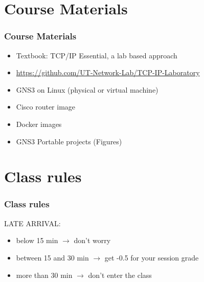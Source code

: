 \documentclass[15pt]{beamer}
\begin{document}
\section{Course Materials}
\begin{frame}
    \frametitle{Course Materials}

    \begin{itemize}
        \item Textbook: TCP/IP Essential, a lab based approach
        \item \url{https://github.com/UT-Network-Lab/TCP-IP-Laboratory}
        \item GNS3 on Linux (physical or virtual machine)
        \item Cisco router image
        \item Docker images
        \item GNS3 Portable projects (Figures)
    \end{itemize}

\end{frame}

\section{Class rules}
\begin{frame}
    \frametitle{Class rules}

    LATE ARRIVAL:
    \begin{itemize}
        \item below 15 min $\rightarrow$ don’t worry
        \item {\color{orange} between 15 and 30 min $\rightarrow$ get -0.5 for your session grade}
        \item {\color{red} more than 30 min $\rightarrow$ don’t enter the class}
    \end{itemize}

\end{frame}
\end{document}
